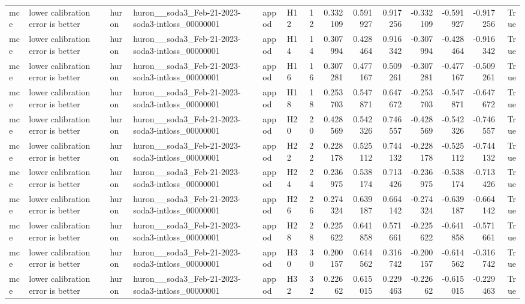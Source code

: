 \begin{longtable}{llllllrrrrrrrr}
mce & lower calibration error is better & huron & huron\_\_soda3\_Feb-21-2023-soda3-intloss\_00000001 & appod & H12 & 12 & 0.332109 & 0.591927 & 0.917256 & -0.332109 & -0.591927 & -0.917256 & True \\
mce & lower calibration error is better & huron & huron\_\_soda3\_Feb-21-2023-soda3-intloss\_00000001 & appod & H14 & 14 & 0.307994 & 0.428464 & 0.916342 & -0.307994 & -0.428464 & -0.916342 & True \\
mce & lower calibration error is better & huron & huron\_\_soda3\_Feb-21-2023-soda3-intloss\_00000001 & appod & H16 & 16 & 0.307281 & 0.477167 & 0.509261 & -0.307281 & -0.477167 & -0.509261 & True \\
mce & lower calibration error is better & huron & huron\_\_soda3\_Feb-21-2023-soda3-intloss\_00000001 & appod & H18 & 18 & 0.253703 & 0.547871 & 0.647672 & -0.253703 & -0.547871 & -0.647672 & True \\
mce & lower calibration error is better & huron & huron\_\_soda3\_Feb-21-2023-soda3-intloss\_00000001 & appod & H20 & 20 & 0.428569 & 0.542326 & 0.746557 & -0.428569 & -0.542326 & -0.746557 & True \\
mce & lower calibration error is better & huron & huron\_\_soda3\_Feb-21-2023-soda3-intloss\_00000001 & appod & H22 & 22 & 0.228178 & 0.525112 & 0.744132 & -0.228178 & -0.525112 & -0.744132 & True \\
mce & lower calibration error is better & huron & huron\_\_soda3\_Feb-21-2023-soda3-intloss\_00000001 & appod & H24 & 24 & 0.236975 & 0.538174 & 0.713426 & -0.236975 & -0.538174 & -0.713426 & True \\
mce & lower calibration error is better & huron & huron\_\_soda3\_Feb-21-2023-soda3-intloss\_00000001 & appod & H26 & 26 & 0.274324 & 0.639187 & 0.664142 & -0.274324 & -0.639187 & -0.664142 & True \\
mce & lower calibration error is better & huron & huron\_\_soda3\_Feb-21-2023-soda3-intloss\_00000001 & appod & H28 & 28 & 0.225622 & 0.641858 & 0.571661 & -0.225622 & -0.641858 & -0.571661 & True \\
mce & lower calibration error is better & huron & huron\_\_soda3\_Feb-21-2023-soda3-intloss\_00000001 & appod & H30 & 30 & 0.200157 & 0.614562 & 0.316742 & -0.200157 & -0.614562 & -0.316742 & True \\
mce & lower calibration error is better & huron & huron\_\_soda3\_Feb-21-2023-soda3-intloss\_00000001 & appod & H32 & 32 & 0.22662 & 0.615015 & 0.229463 & -0.22662 & -0.615015 & -0.229463 & True \\

\end{longtable}

